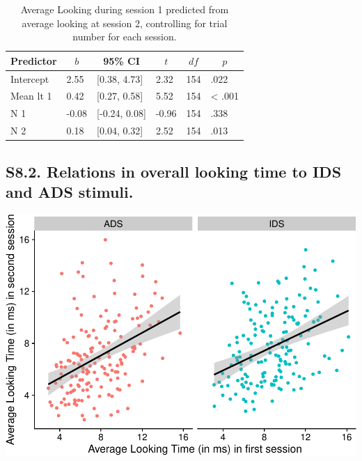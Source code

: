 \documentclass[
  man, donotrepeattitle,floatsintext]{apa6}
\begin{document}
\begin{table}[tbp]

\begin{center}
\begin{threeparttable}

\caption{\label{tab:unnamed-chunk-16}Average Looking during session 1 predicted from average looking at session 2, controlling for trial number for each session.}

\begin{tabular}{llllll}
\toprule
Predictor & \multicolumn{1}{c}{$b$} & \multicolumn{1}{c}{95\% CI} & \multicolumn{1}{c}{$t$} & \multicolumn{1}{c}{$\mathit{df}$} & \multicolumn{1}{c}{$p$}\\
\midrule
Intercept & 2.55 & {}[0.38, 4.73] & 2.32 & 154 & .022\\
Mean lt 1 & 0.42 & {}[0.27, 0.58] & 5.52 & 154 & < .001\\
N 1 & -0.08 & {}[-0.24, 0.08] & -0.96 & 154 & .338\\
N 2 & 0.18 & {}[0.04, 0.32] & 2.52 & 154 & .013\\
\bottomrule
\end{tabular}

\end{threeparttable}
\end{center}

\end{table}

\hypertarget{s8.2.-relations-in-overall-looking-time-to-ids-and-ads-stimuli.}{%
\subsection{S8.2. Relations in overall looking time to IDS and ADS stimuli.}\label{s8.2.-relations-in-overall-looking-time-to-ids-and-ads-stimuli.}}

\includegraphics{MB1T_supplement_files/figure-latex/unnamed-chunk-17-1.pdf}
\end{document}
